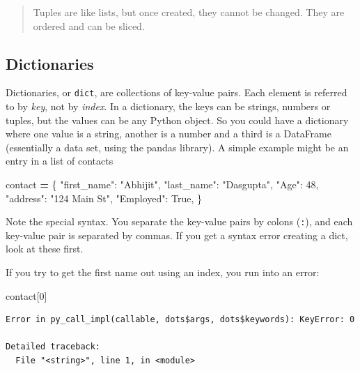 \documentclass[
  letterpaper,
]{scrbook}
\newenvironment{Shaded}{\begin{snugshade}}{\end{snugshade}}
\newcommand{\DecValTok}[1]{\textcolor[rgb]{0.00,0.00,0.81}{#1}}
\newcommand{\NormalTok}[1]{#1}
\newcommand{\OperatorTok}[1]{\textcolor[rgb]{0.81,0.36,0.00}{\textbf{#1}}}
\newcommand{\StringTok}[1]{\textcolor[rgb]{0.31,0.60,0.02}{#1}}
\newcommand{\VariableTok}[1]{\textcolor[rgb]{0.00,0.00,0.00}{#1}}
\begin{document}
\begin{quote}
Tuples are like lists, but once created, they cannot be changed. They are ordered and can be sliced.
\end{quote}

\hypertarget{dictionaries}{%
\subsection{Dictionaries}\label{dictionaries}}

Dictionaries, or \texttt{dict}, are collections of key-value pairs. Each element is referred to by \emph{key}, not by \emph{index}. In a dictionary, the keys can be strings, numbers or tuples, but the values can be any Python object. So you could have a dictionary where one value is a string, another is a number and a third is a DataFrame (essentially a data set, using the pandas library). A simple example might be an entry in a list of contacts

\begin{Shaded}
\begin{Highlighting}[]
\NormalTok{contact }\OperatorTok{=}\NormalTok{ \{}
    \StringTok{"first_name"}\NormalTok{: }\StringTok{"Abhijit"}\NormalTok{,}
    \StringTok{"last_name"}\NormalTok{: }\StringTok{"Dasgupta"}\NormalTok{,}
    \StringTok{"Age"}\NormalTok{: }\DecValTok{48}\NormalTok{,}
    \StringTok{"address"}\NormalTok{: }\StringTok{"124 Main St"}\NormalTok{,}
    \StringTok{"Employed"}\NormalTok{: }\VariableTok{True}\NormalTok{,}
\NormalTok{\}}
\end{Highlighting}
\end{Shaded}

Note the special syntax. You separate the key-value pairs by colons (\texttt{:}), and each key-value pair is separated by commas. If you get a syntax error creating a dict, look at these first.

If you try to get the first name out using an index, you run into an error:

\begin{Shaded}
\begin{Highlighting}[]
\NormalTok{contact[}\DecValTok{0}\NormalTok{]}
\end{Highlighting}
\end{Shaded}

\begin{verbatim}
Error in py_call_impl(callable, dots$args, dots$keywords): KeyError: 0

Detailed traceback: 
  File "<string>", line 1, in <module>
\end{verbatim}
\end{document}
